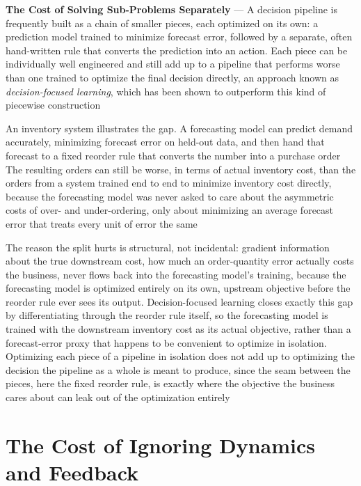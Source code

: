 \textbf{The Cost of Solving Sub-Problems Separately} --- A decision pipeline is frequently
built as a chain of smaller pieces, each optimized on its own: a prediction model
trained to minimize forecast error, followed by a separate, often hand-written rule
that converts the prediction into an action. Each piece can be individually well
engineered and still add up to a pipeline that performs worse than one trained
to optimize the final decision directly, an approach known as \emph{decision-focused
learning}, which has been shown to outperform this kind of piecewise construction

An inventory system illustrates the gap. A forecasting model can predict demand accurately,
minimizing forecast error on held-out data, and then hand that forecast to a fixed
reorder rule that converts the number into a purchase order The resulting orders
can still be worse, in terms of actual inventory cost, than the orders from a system
trained end to end to minimize inventory cost directly, because the forecasting
model was never asked to care about the asymmetric costs of over- and under-ordering,
only about minimizing an average forecast error that treats every unit of error
the same

The reason the split hurts is structural, not incidental: gradient information about
the true downstream cost, how much an order-quantity error actually costs the
business, never flows back into the forecasting model's training, because the
forecasting model is optimized entirely on its own, upstream objective before the
reorder rule ever sees its output. Decision-focused learning closes exactly this
gap by differentiating through the reorder rule itself, so the forecasting model
is trained with the downstream inventory cost as its actual objective, rather
than a forecast-error proxy that happens to be convenient to optimize in
isolation. Optimizing each piece of a pipeline in isolation does not add up to optimizing
the decision the pipeline as a whole is meant to produce, since the seam between
the pieces, here the fixed reorder rule, is exactly where the objective the
business cares about can leak out of the optimization entirely

\section{The Cost of Ignoring Dynamics and Feedback}
\label{chap:cost-ignoring-dynamics-feedback}

